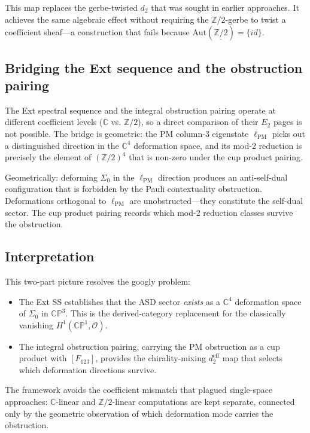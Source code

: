 \documentclass[11pt,a4paper]{article}
\theoremstyle{remark}
\newcommand{\CP}{\mathbb{CP}}
\newcommand{\C}{\mathbb{C}}
\newcommand{\Z}{\mathbb{Z}}
\newcommand{\cO}{\mathcal{O}}
\begin{document}
This map replaces the gerbe-twisted $d_2$ that was sought in
earlier approaches. It achieves the same algebraic effect
without requiring the $\Z/2$-gerbe to twist a coefficient
sheaf---a construction that fails because
$\text{Aut}(\underline{\Z/2}) = \{id\}$.

\subsection{Bridging the Ext sequence and the obstruction pairing}
\label{sec:bridge}

The Ext spectral sequence and the integral obstruction pairing
operate at different coefficient levels ($\C$ vs. $\Z/2$), so
a direct comparison of their $E_2$ pages is not possible.
The bridge is geometric: the PM column-3 eigenstate
$\ell_{\text{PM}}$ picks out a distinguished direction in the
$\C^4$ deformation space, and its mod-2 reduction is precisely
the element of $(\Z/2)^4$ that is non-zero under the cup product
pairing.

Geometrically: deforming $\Sigma_0$ in the $\ell_{\text{PM}}$
direction produces an anti-self-dual configuration that is
forbidden by the Pauli contextuality obstruction. Deformations
orthogonal to $\ell_{\text{PM}}$ are unobstructed---they
constitute the self-dual sector. The cup product pairing records
which mod-2 reduction classes survive the obstruction.

\subsection{Interpretation}
\label{sec:interpretation}

This two-part picture resolves the googly problem:
\begin{itemize}
  \item The Ext SS establishes that the ASD sector \emph{exists}
    as a $\C^4$ deformation space of $\Sigma_0$ in $\CP^3$.
    This is the derived-category replacement for the classically
    vanishing $H^1(\CP^1, \cO)$.
  \item The integral obstruction pairing, carrying the PM
    obstruction as a cup product with $[F_{123}]$, provides
    the chirality-mixing $d_2^{\text{eff}}$ map that selects
    which deformation directions survive.
\end{itemize}

The framework avoids the coefficient mismatch that plagued
single-space approaches: $\C$-linear and $\Z/2$-linear
computations are kept separate, connected only by the geometric
observation of which deformation mode carries the obstruction.
\end{document}
